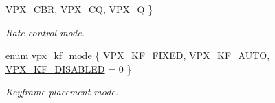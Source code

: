 \begin{DoxyCompactItemize}
\hyperlink{group__encoder_ggaf50e74d91be4cae6f70dfeba5b7410d2a8b02853cb35790d60cc171a11f6c268a}{V\+P\+X\+\_\+\+C\+BR}, 
\hyperlink{group__encoder_ggaf50e74d91be4cae6f70dfeba5b7410d2a5f2fd02b55c67d62bfd79380bcb03f63}{V\+P\+X\+\_\+\+CQ}, 
\hyperlink{group__encoder_ggaf50e74d91be4cae6f70dfeba5b7410d2a5ebb5564dc5e8ec99d3c6221d89b8858}{V\+P\+X\+\_\+Q}
 \}\begin{DoxyCompactList}\small\item\em Rate control mode. \end{DoxyCompactList}
\item 
enum \hyperlink{group__encoder_ga9f461802aa4db35c04a8b23837987f40}{vpx\+\_\+kf\+\_\+mode} \{ \hyperlink{group__encoder_gga9f461802aa4db35c04a8b23837987f40a6bd87eea515c65661a5241a0f01e44a6}{V\+P\+X\+\_\+\+K\+F\+\_\+\+F\+I\+X\+ED}, 
\hyperlink{group__encoder_gga9f461802aa4db35c04a8b23837987f40ab1b423e78f72e77d2dce755d6c9652f8}{V\+P\+X\+\_\+\+K\+F\+\_\+\+A\+U\+TO}, 
\hyperlink{group__encoder_gga9f461802aa4db35c04a8b23837987f40a56513f60cbf3434ca0092173005d0ab2}{V\+P\+X\+\_\+\+K\+F\+\_\+\+D\+I\+S\+A\+B\+L\+ED} = 0
 \}\begin{DoxyCompactList}\small\item\em Keyframe placement mode. \end{DoxyCompactList}
\end{DoxyCompactItemize}
